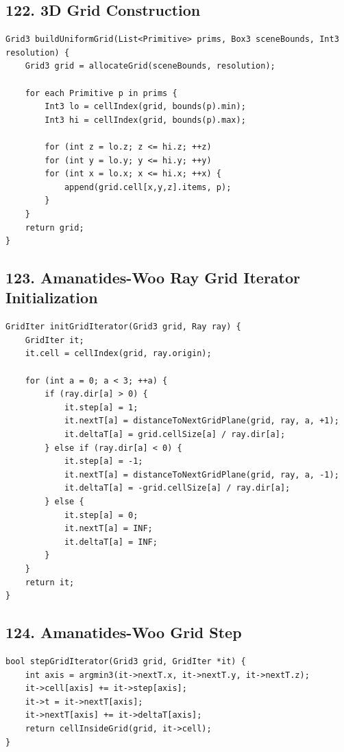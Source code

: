 \documentclass[10pt,letterpaper]{article}
\begin{document}
\subsection{122. 3D Grid Construction}

\begin{verbatim}
Grid3 buildUniformGrid(List<Primitive> prims, Box3 sceneBounds, Int3 resolution) {
    Grid3 grid = allocateGrid(sceneBounds, resolution);

    for each Primitive p in prims {
        Int3 lo = cellIndex(grid, bounds(p).min);
        Int3 hi = cellIndex(grid, bounds(p).max);

        for (int z = lo.z; z <= hi.z; ++z)
        for (int y = lo.y; y <= hi.y; ++y)
        for (int x = lo.x; x <= hi.x; ++x) {
            append(grid.cell[x,y,z].items, p);
        }
    }
    return grid;
}
\end{verbatim}

\subsection{123. Amanatides-Woo Ray Grid Iterator Initialization}

\begin{verbatim}
GridIter initGridIterator(Grid3 grid, Ray ray) {
    GridIter it;
    it.cell = cellIndex(grid, ray.origin);

    for (int a = 0; a < 3; ++a) {
        if (ray.dir[a] > 0) {
            it.step[a] = 1;
            it.nextT[a] = distanceToNextGridPlane(grid, ray, a, +1);
            it.deltaT[a] = grid.cellSize[a] / ray.dir[a];
        } else if (ray.dir[a] < 0) {
            it.step[a] = -1;
            it.nextT[a] = distanceToNextGridPlane(grid, ray, a, -1);
            it.deltaT[a] = -grid.cellSize[a] / ray.dir[a];
        } else {
            it.step[a] = 0;
            it.nextT[a] = INF;
            it.deltaT[a] = INF;
        }
    }
    return it;
}
\end{verbatim}

\subsection{124. Amanatides-Woo Grid Step}

\begin{verbatim}
bool stepGridIterator(Grid3 grid, GridIter *it) {
    int axis = argmin3(it->nextT.x, it->nextT.y, it->nextT.z);
    it->cell[axis] += it->step[axis];
    it->t = it->nextT[axis];
    it->nextT[axis] += it->deltaT[axis];
    return cellInsideGrid(grid, it->cell);
}
\end{verbatim}
\end{document}
